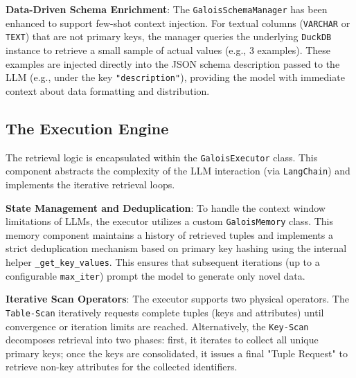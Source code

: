\textbf{Data-Driven Schema Enrichment}: The \texttt{GaloisSchemaManager} has been enhanced to support few-shot context injection. For textual columns (\texttt{VARCHAR} or \texttt{TEXT}) that are not primary keys, the manager queries the underlying \texttt{DuckDB} instance to retrieve a small sample of actual values (e.g., 3 examples). These examples are injected directly into the JSON schema description passed to the LLM (e.g., under the key \texttt{"description"}), providing the model with immediate context about data formatting and distribution.

\subsection{The Execution Engine}

The retrieval logic is encapsulated within the \texttt{GaloisExecutor} class. This component abstracts the complexity of the LLM interaction (via \texttt{LangChain}) and implements the iterative retrieval loops.

\textbf{State Management and Deduplication}: To handle the context window limitations of LLMs, the executor utilizes a custom \texttt{GaloisMemory} class. This memory component maintains a history of retrieved tuples and implements a strict deduplication mechanism based on primary key hashing using the internal helper \texttt{\_get\_key\_values}. This ensures that subsequent iterations (up to a configurable \texttt{max\_iter}) prompt the model to generate only novel data.

\textbf{Iterative Scan Operators}: The executor supports two physical operators. The \texttt{Table-Scan} iteratively requests complete tuples (keys and attributes) until convergence or iteration limits are reached. Alternatively, the \texttt{Key-Scan} decomposes retrieval into two phases: first, it iterates to collect all unique primary keys; once the keys are consolidated, it issues a final "Tuple Request" to retrieve non-key attributes for the collected identifiers.



